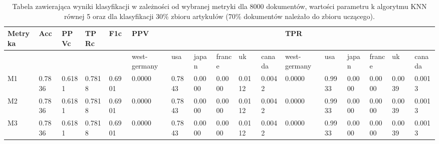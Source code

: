 \documentclass{classrep}
\begin{document}
\begin{table}[!htbp]
    \centering
\caption{Tabela zawierająca wyniki klasyfikacji w zależności od wybranej metryki dla 8000 dokumentów, wartości parametru k algorytmu KNN równej 5 oraz dla klasyfikacji 30\% zbioru artykułów (70\% dokumentów należało do zbioru uczącego).}
\begin{adjustbox}{max width=\textwidth}
    \begin{tabular}{|l|l|l|l|l|l|l|l|l|l|l|l|l|l|l|l|l|}
    \hline
        Metryka & Acc & PPVc & TPRc & F1c & PPV & ~ & ~ & ~ & ~ & ~ & TPR & ~ & ~ & ~ & ~ & ~ \\ \hline
        ~ & ~ & ~ & ~ & ~ & west-germany  & usa  & japan & france & uk & canada & west-germany  & usa  & japan & france & uk & canada \\ \hline
        M1 & 0.7836 & 0.6181 & 0.7818 & 0.6901 & 0.0000 & 0.7843 & 0.0000 & 0.0000 & 0.0112 & 0.0042 & 0.0000 & 0.9933 & 0.0000 & 0.0000 & 0.0039 & 0.0013 \\ \hline
        M2 & 0.7836 & 0.6181 & 0.7818 & 0.6901 & 0.0000 & 0.7843 & 0.0000 & 0.0000 & 0.0112 & 0.0042 & 0.0000 & 0.9933 & 0.0000 & 0.0000 & 0.0039 & 0.0013 \\ \hline
        M3 & 0.7836 & 0.6181 & 0.7818 & 0.6901 & 0.0000 & 0.7843 & 0.0000 & 0.0000 & 0.0112 & 0.0042 & 0.0000 & 0.9933 & 0.0000 & 0.0000 & 0.0039 & 0.0013 \\ \hline
    \end{tabular}
\end{adjustbox}
\end{table}
\end{document}

